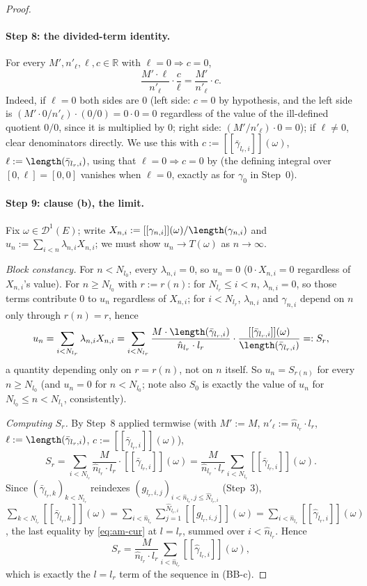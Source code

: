 \begin{proof}
  \paragraph{Step 8: the divided-term identity.} For every $M',n'_\ell,\ell,c\in\mathbb R$ with
  $\ell=0\Rightarrow c=0$,
  \[
    \frac{M'\cdot\ell}{n'_\ell}\cdot\frac c\ell = \frac{M'}{n'_\ell}\cdot c
    .
  \]
  Indeed, if $\ell=0$ both sides are $0$ (left side: $c=0$ by hypothesis, and the left side is
  $(M'\cdot0/n'_\ell)\cdot(0/0)=0\cdot0=0$ regardless of the value of the ill-defined quotient
  $0/0$, since it is multiplied by $0$; right side: $(M'/n'_\ell)\cdot0=0$); if $\ell\ne0$, clear
  denominators directly. We use this with $c:=[[\bar\gamma_{l_r,i}]](\omega)$,
  $\ell:=\length(\bar\gamma_{l_r,i})$, using that $\ell=0\Rightarrow c=0$ by
   (the defining integral over $[0,\ell]=[0,0]$ vanishes when $\ell=0$,
  exactly as for $\gamma_0$ in Step~0).

  \paragraph{Step 9: clause (b), the limit.} Fix $\omega\in\mathcal D^1(E)$; write
  $X_{n,i}:=[[\gamma_{n,i}]](\omega)/\length(\gamma_{n,i})$ and
  $u_n:=\sum_{i<n}\lambda_{n,i}X_{n,i}$; we must show $u_n\to T(\omega)$ as $n\to\infty$.

  \emph{Block constancy.} For $n<N_{l_0}$, every $\lambda_{n,i}=0$, so $u_n=0$ ($0\cdot X_{n,i}=0$
  regardless of $X_{n,i}$'s value). For $n\ge N_{l_0}$ with $r:=r(n)$: for $N_{l_r}\le i<n$,
  $\lambda_{n,i}=0$, so those terms contribute $0$ to $u_n$ regardless of $X_{n,i}$; for $i<N_{l_r}$,
  $\lambda_{n,i}$ and $\gamma_{n,i}$ depend on $n$ only through $r(n)=r$, hence
  \[
    u_n = \sum_{i<N_{l_r}} \lambda_{n,i} X_{n,i}
    = \sum_{i<N_{l_r}} \frac{M\cdot\length(\bar\gamma_{l_r,i})}{\hat n_{l_r}\cdot l_r}\cdot
        \frac{[[\bar\gamma_{l_r,i}]](\omega)}{\length(\bar\gamma_{l_r,i})}
    =: S_r
    ,
  \]
  a quantity depending only on $r=r(n)$, not on $n$ itself. So $u_n=S_{r(n)}$ for every
  $n\ge N_{l_0}$ (and $u_n=0$ for $n<N_{l_0}$; note also $S_0$ is exactly the value of $u_n$ for
  $N_{l_0}\le n<N_{l_1}$, consistently).

  \emph{Computing $S_r$.} By Step~8 applied termwise (with $M':=M$, $n'_\ell:=\hat n_{l_r}\cdot
  l_r$, $\ell:=\length(\bar\gamma_{l_r,i})$, $c:=[[\bar\gamma_{l_r,i}]](\omega)$),
  \[
    S_r = \sum_{i<N_{l_r}} \frac{M}{\hat n_{l_r}\cdot l_r}\cdot[[\bar\gamma_{l_r,i}]](\omega)
    = \frac{M}{\hat n_{l_r}\cdot l_r}\sum_{i<N_{l_r}}[[\bar\gamma_{l_r,i}]](\omega)
    .
  \]
  Since $(\bar\gamma_{l_r,k})_{k<N_{l_r}}$ reindexes $(g_{l_r,i,j})_{i<\hat n_{l_r},
  j\le\hat N_{l_r,i}}$ (Step~3), $\sum_{k<N_{l_r}}[[\bar\gamma_{l_r,k}]](\omega) =
  \sum_{i<\hat n_{l_r}}\sum_{j=1}^{\hat N_{l_r,i}}[[g_{l_r,i,j}]](\omega) =
  \sum_{i<\hat n_{l_r}}[[\hat\gamma_{l_r,i}]](\omega)$, the last equality by \eqref{eq:am-cur} at
  $l=l_r$, summed over $i<\hat n_{l_r}$. Hence
  \[
    S_r = \frac{M}{\hat n_{l_r}\cdot l_r}\sum_{i<\hat n_{l_r}}[[\hat\gamma_{l_r,i}]](\omega)
    ,
  \]
  which is exactly the $l=l_r$ term of the sequence in (BB-c).


\end{proof}
